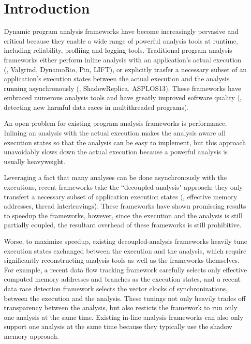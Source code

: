 \section{Introduction} \label{sec:intro}



Dynamic program analysis frameworks have become increasingly pervasive and 
critical because they enable a wide range of powerful analysis tools at 
runtime, including reliability, profliing and logging tools. Traditional 
program analysis frameworks either perform inline analysis with an 
application's actual execution (\eg, Valgrind, DynamoRio, Pin, LIFT), or 
explicitly trasfer a necessary subset of an application's execution states 
between the actual execution and the analysis running asynchronously (\eg, 
ShadowReplica, ASPLOS13). These frameworks have embraced numerous analysis 
tools and have greatly improved software quality (\eg, detecting new harmful 
data races in multithreaded programs).


An open problem for existing program analysis frameworks is performance. 
Inlining an analysis with the actual execution makes the analysis aware all 
execution states so that the analysis can be easy to implement, but this 
approach unavoidably slows down the actual execution because a powerful 
analysis is usually heavyweight.

Leveraging a fact that many analyses can be done asynchronously with the 
executions, recent frameworks take the ``decoupled-analysis" approach: they 
only transfert a necessary subset of application execution states (\eg, 
effective memory addresses, thread interleavings). These frameworks have shown 
promissing results to speedup the frameworks, however, since the execution and 
the analysis is still partially coupled, the resultant overhead of these 
frameworks is still prohibitive.

Worse, to maximize speedup, existing decoupled-analysis frameworks heavily tune 
execution states exchanged between the execution and the analysis, which 
require significantly reconstructing analysis tools as well as the frameworks 
themselves. For example, a recent data flow tracking framework carefully 
selects only effective computed memory addresses and branches as the execution 
states, and a recent data race detection framework selects the vector clocks of 
synchronizations, between the execution and the analysis. These tunings not 
only heavily trades off transparency between the analysis, but also resticts 
the framework to run only one analysis at the same time. Existing in-line 
analysis frameworks can also only support one analysis at the same time because 
they typically use the shadow memory approach.


